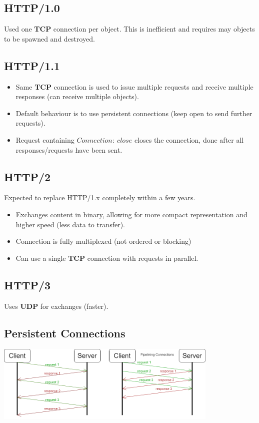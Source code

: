 \subsection{HTTP/1.0}
Used one \textbf{TCP} connection per object. This is inefficient and requires may objects to be spawned and destroyed.
\subsection{HTTP/1.1}
\begin{itemize}
    \setlength\itemsep{0em}
    \item Same \textbf{TCP} connection is used to issue multiple requests and receive multiple responses (can receive multiple objects).
    \item Default behaviour is to use persistent connections (keep open to send further requests).
    \item Request containing $Connection: \ close$ closes the connection, done after all responses/requests have been sent.
\end{itemize}

\subsection{HTTP/2}
Expected to replace HTTP/1.x completely within a few years.
\begin{itemize}
    \setlength\itemsep{0em}
    \item Exchanges content in binary, allowing for more compact representation and higher speed (less data to transfer).
    \item Connection is fully multiplexed (not ordered or blocking)
    \item Can use a single \textbf{TCP} connection with requests in parallel.
\end{itemize}

\subsection{HTTP/3}
Uses \textbf{UDP} for exchanges (faster).
\subsection{Persistent Connections}
\begin{center}\includegraphics[width=0.8\textwidth]{the_web/images/requests.png}\end{center}
